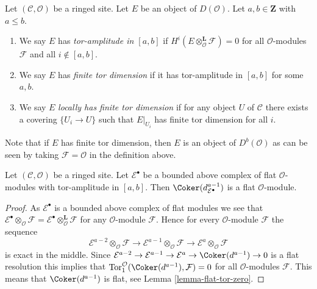 \begin{definition}
\label{definition-tor-amplitude}
Let $(\mathcal{C}, \mathcal{O})$ be a ringed site.
Let $E$ be an object of $D(\mathcal{O})$.
Let $a, b \in \mathbf{Z}$ with $a \leq b$.
\begin{enumerate}
\item We say $E$ has {\it tor-amplitude in $[a, b]$}
if $H^i(E \otimes_\mathcal{O}^\mathbf{L} \mathcal{F}) = 0$
for all $\mathcal{O}$-modules $\mathcal{F}$ and all $i \not \in [a, b]$.
\item We say $E$ has {\it finite tor dimension}
if it has tor-amplitude in $[a, b]$ for some $a, b$.
\item We say $E$ {\it locally has finite tor dimension} if for any
object $U$ of $\mathcal{C}$ there exists a covering $\{U_i \to U\}$
such that $E|_{U_i}$ has finite tor dimension for all $i$.
\end{enumerate}
\end{definition}

\noindent
Note that if $E$ has finite tor dimension, then $E$ is an object of
$D^b(\mathcal{O})$ as can be seen by taking $\mathcal{F} = \mathcal{O}$
in the definition above.

\begin{lemma}
\label{lemma-last-one-flat}
Let $(\mathcal{C}, \mathcal{O})$ be a ringed site.
Let $\mathcal{E}^\bullet$ be a bounded above complex of flat
$\mathcal{O}$-modules with tor-amplitude in $[a, b]$.
Then $\Coker(d_{\mathcal{E}^\bullet}^{a - 1})$ is a flat
$\mathcal{O}$-module.
\end{lemma}

\begin{proof}
As $\mathcal{E}^\bullet$ is a bounded above complex of flat modules we see that
$\mathcal{E}^\bullet \otimes_\mathcal{O} \mathcal{F} =
\mathcal{E}^\bullet \otimes_\mathcal{O}^{\mathbf{L}} \mathcal{F}$
for any $\mathcal{O}$-module $\mathcal{F}$.
Hence for every $\mathcal{O}$-module $\mathcal{F}$ the sequence
$$
\mathcal{E}^{a - 2} \otimes_\mathcal{O} \mathcal{F} \to
\mathcal{E}^{a - 1} \otimes_\mathcal{O} \mathcal{F} \to
\mathcal{E}^a \otimes_\mathcal{O} \mathcal{F}
$$
is exact in the middle. Since
$\mathcal{E}^{a - 2} \to \mathcal{E}^{a - 1} \to \mathcal{E}^a \to
\Coker(d^{a - 1}) \to 0$
is a flat resolution this implies that
$\text{Tor}_1^\mathcal{O}(\Coker(d^{a - 1}), \mathcal{F}) = 0$
for all $\mathcal{O}$-modules $\mathcal{F}$. This means that
$\Coker(d^{a - 1})$ is flat, see Lemma \ref{lemma-flat-tor-zero}.
\end{proof}

